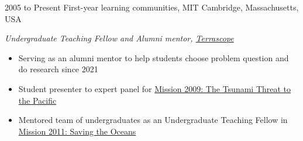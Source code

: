 \documentclass[10pt, a4]{friggeri-cv}
\begin{document}
\begin{entrylist}

\entry
{2005 to Present}
{First-year learning communities, MIT}
{Cambridge, Massachusetts, USA}
{\emph{Undergraduate Teaching Fellow and Alumni mentor, \href{http://web.mit.edu/terrascope/www/}{Terrascope}}
\begin{itemize}
	\item Serving as an alumni mentor to help students choose problem question and do research since 2021
	\item Student presenter to expert panel for \href{http://web.mit.edu/12.000/www/m2009/finalwebsite/}{Mission 2009: The Tsunami Threat to the Pacific}
	\item Mentored team of undergraduates as an Undergraduate Teaching Fellow in \href{http://web.mit.edu/12.000/www/m2011/finalwebsite/}{Mission 2011: Saving the Oceans}
\end{itemize}
}
\end{entrylist}

\newpage
\end{document}
